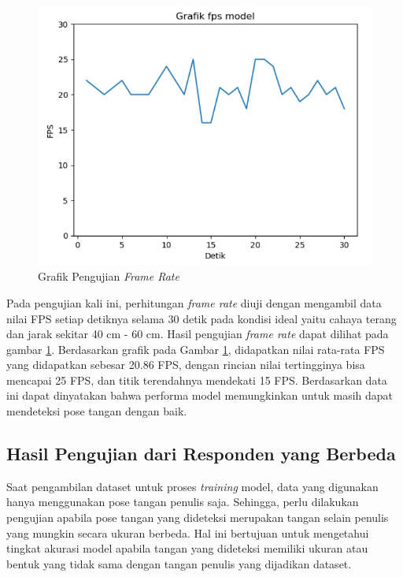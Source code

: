 \begin{figure}[!htb]
  \centering
  \includegraphics[scale=0.8]{gambar/pengujian-fps/grafik-pengujian-fps.png}
  \caption{Grafik Pengujian \emph{Frame Rate}}
  \label{fig:Grafik Pengujian Frame Rate}
\end{figure}

Pada pengujian kali ini, perhitungan \emph{frame rate} diuji dengan mengambil data nilai FPS setiap detiknya selama 30 detik pada kondisi ideal yaitu cahaya terang dan jarak sekitar 40 cm - 60 cm. Hasil pengujian \emph{frame rate} dapat dilihat pada gambar \ref{fig:Grafik Pengujian Frame Rate}. Berdasarkan grafik pada Gambar \ref{fig:Grafik Pengujian Frame Rate}, didapatkan nilai rata-rata FPS yang didapatkan sebesar 20.86 FPS, dengan rincian nilai tertingginya bisa mencapai 25 FPS, dan titik terendahnya mendekati 15 FPS. Berdasarkan data ini dapat dinyatakan bahwa performa model memungkinkan untuk masih dapat mendeteksi pose tangan dengan baik. 

\subsection{Hasil Pengujian dari Responden yang Berbeda}
\label{subsec:Hasil Pengujian dari Responden yang Berbeda}
Saat pengambilan dataset untuk proses \emph{\emph{training}} model, data yang digunakan hanya menggunakan pose tangan penulis saja. Sehingga, perlu dilakukan pengujian apabila pose tangan yang dideteksi merupakan tangan selain penulis yang mungkin secara ukuran berbeda. Hal ini bertujuan untuk mengetahui tingkat akurasi model apabila tangan yang dideteksi memiliki ukuran atau bentuk yang tidak sama dengan tangan penulis yang dijadikan dataset.

